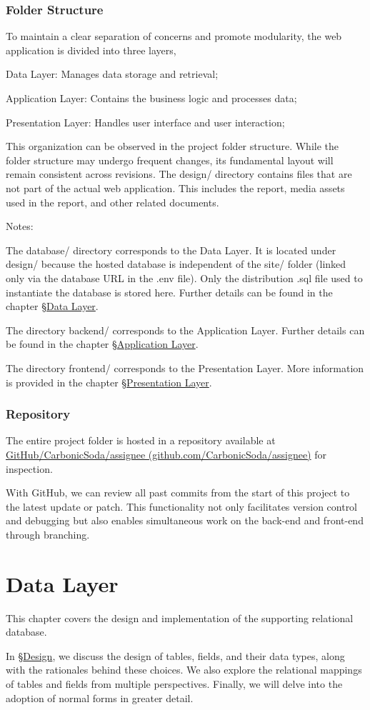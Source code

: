 \documentclass[12pt]{report}
\newcommand{\n}{\par}
\newcommand{\br}{\n\vspace{1 em}\n}
\begin{document}
\subsection{Folder Structure} \label{overview.project-structure.folder-structure}
To maintain a clear separation of concerns and promote modularity, the web application is divided into three layers,\n
Data Layer: Manages data storage and retrieval;\n
Application Layer: Contains the business logic and processes data;\n
Presentation Layer: Handles user interface and user interaction;
\br
This organization can be observed in the project folder structure.
While the folder structure may undergo frequent changes, its fundamental layout will remain consistent across revisions.
\newpage
{}
\vspace{2 em}
The design/ directory contains files that are not part of the actual web application.
This includes the report, media assets used in the report, and other related documents.
\br
Notes:\n
The database/ directory corresponds to the Data Layer.
It is located under design/ because the hosted database is independent of the site/ folder (linked only via the database URL in the .env file).
Only the distribution .sql file used to instantiate the database is stored here.
Further details can be found in the chapter \S \hyperref[data-layer]{Data Layer}.
\br
The directory backend/ corresponds to the Application Layer.
Further details can be found in the chapter \S \hyperref[application-layer]{Application Layer}.
\br
The directory frontend/ corresponds to the Presentation Layer.
More information is provided in the chapter \S \hyperref[presentation-layer]{Presentation Layer}.


\subsection{Repository} \label{overview.project-structure.repository}
The entire project folder is hosted in a repository available at
\href{https://github.com/CarbonicSoda/assignee}{GitHub/Carbonic\-Soda/assignee (github.com/CarbonicSoda/assignee)} for inspection.
\br
With GitHub, we can review all past commits from the start of this project to the latest update or patch.
This functionality not only facilitates version control and debugging but also enables simultaneous work on the back-end and front-end through branching.




\chapter{Data Layer} \label{data-layer}
This chapter covers the design and implementation of the supporting relational database.
\br
In \S \hyperref[data-layer.design]{Design}, we discuss the design of tables, fields, and their data types, along with the rationales behind these choices. We also explore the relational mappings of tables and fields from multiple perspectives. Finally, we will delve into the adoption of normal forms in greater detail.
\br
\end{document}
